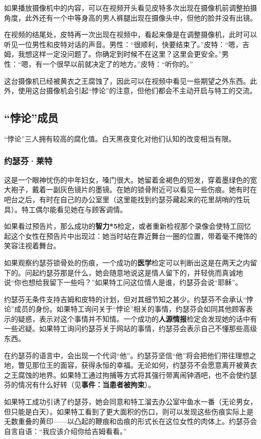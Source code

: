 如果播放摄像机中的内容，可以在视频开头看见皮特多次出现在摄像机前调整拍摄角度，此外还有一个中等身高的男人裤腿出现在摄像头中，但他的脸并没有出镜。

在视频的结尾处，皮特再一次出现在视频中，看起来像是在调整摄像机，此时可以听见一位男性和皮特对话的声音。男性：“很顺利，快要结束了。”皮特：“嗯，吉姆，我想这样一定没问题了。你确定到时候不在这里？这里会更安全。”男性：“嗯，有一个很早以前就决定了的地方。”皮特：“听你的。”

这台摄像机已经被黄衣之王腐蚀了，因此可以在视频中看见一些期望之外东西。此外，使用这台摄像机会引起“悖论”的注意，但他们都会不主动开启与特工的交流。

\subsection{“悖论”成员}
“悖论”三人拥有较高的腐化值。白天黑夜变化对他们认知的改变相当有限。

\subsubsection{约瑟芬·莱特}
这是一个眼神忧伤的中年妇女，嗓门很大。她留着金褐色的短发，穿着墨绿色的宽大袍子，戴着一副灰色镜片的墨镜。在她的锁骨附近可以看见一些伤痕。她有时在吧台之后，有时在自己的办公室里（这里能找到约瑟芬藏起来的花里胡哨的性玩具）。特工偶尔能看见她在与顾客调情。

如果看过预告片，那么成功的\textbf{智力*5}检定，或者重新检视那个录像会使特工回忆起这个女性在预告片中出现过：她当时站在靠近舞台一圈的位置，带着毫不掩饰的笑容注视着舞台。

如果观察约瑟芬锁骨处的伤痕，一个成功的\textbf{医学}检定可以判断出这是在两天之内留下的。问起约瑟芬那是什么，她会随意地说这是情人留下的，并轻佻而真诚地说“你也想给我留下一些吗？”如果特工问这位情人是谁，约瑟芬会说“耶稣”。

约瑟芬无条件支持吉姆和皮特的计划，但对其细节知之甚少。约瑟芬不会承认“悖论”成员的身份。如果特工询问关于“悖论”相关的事情，约瑟芬会如同其他顾客表示的疑惑，表示对这个事情并不知情。一个成功的\textbf{人源情报}检定会发现她的话中有一些迟疑。如果特工询问约瑟芬关于网站的事情，约瑟芬会表示自己不懂那些高级东西。

在约瑟芬的语言中，会出现一个代词“他”。约瑟芬坚信“他”将会把他们带往理想之地，瞥见那位王的面容，获得永恒的幸福。无论如何，约瑟芬不会愿意离开被黄衣之王腐蚀的地界。如果特工通过拘捕等方式将其强行带离闹钟酒吧，也不会使约瑟芬的情况有什么好转（见\textbf{事件：当患者被拘束}）。

如果特工成功引诱了约瑟芬，她会同意和特工溜去办公室中鱼水一番（无论男女，但只能是白天）。如果特工看到了更大面积的伤口，则可以发现这些伤痕实际上是无数重叠的黄印——以凸起的鞭痕和齿痕的形式长在这位女性的肉体上。约瑟芬会自言自语：“我应该介绍你给吉姆看看。”

